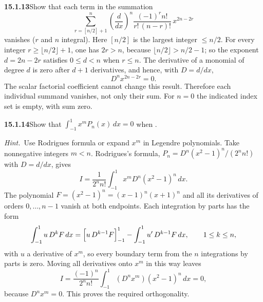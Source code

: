 \par\bigskip
\noindent\textbf{15.1.13}\quad Show that each term in the summation
\[
\sum_{r=[n/2]+1}^{n}\left(\frac{d}{dx}\right)^{n}
\frac{(-1)^{r}n!}{r!\,(n-r)!}\,x^{2n-2r}
\]
vanishes ($r$ and $n$ integral). Here $[n/2]$ is the largest integer
$\le n/2$.
\solution
For every integer $r\ge\lfloor n/2\rfloor+1$, one has $2r>n$,
because $\lfloor n/2\rfloor>n/2-1$; so the exponent $d=2n-2r$
satisfies $0\le d<n$ when $r\le n$.
The derivative of a monomial of degree $d$ is zero after $d+1$
derivatives, and hence, with $D=d/dx$,
\[
D^nx^{2n-2r}=0.
\]
The scalar factorial coefficient cannot change this result. Therefore
each individual summand vanishes, not only their sum.
For $n=0$ the indicated index set is empty, with sum zero.

\par\bigskip
\noindent\textbf{15.1.14}\quad Show that
$\displaystyle\int_{-1}^{1}x^{m}P_{n}(x)\,dx=0$ when .
\par\emph{Hint.}~Use Rodrigues formula or expand $x^{m}$ in Legendre
polynomials.
\solution
Take nonnegative integers $m<n$. Rodrigues's formula,
$P_n=D^n(x^2-1)^n/(2^nn!)$ with $D=d/dx$, gives
\[
I=\frac1{2^nn!}\int_{-1}^1x^mD^n(x^2-1)^n\,dx.
\]
The polynomial $F=(x^2-1)^n=(x-1)^n(x+1)^n$ and all its derivatives
of orders $0,\ldots,n-1$ vanish at both endpoints. Each integration by
parts has the form
\[
\int_{-1}^1u\,D^kF\,dx=\Bigl[u\,D^{k-1}F\Bigr]_{-1}^1
-\int_{-1}^1u'\,D^{k-1}F\,dx,\qquad 1\le k\le n,
\]
with $u$ a derivative of $x^m$, so every boundary term from the $n$
integrations by parts is zero. Moving all derivatives onto $x^m$ in
this way leaves
\[
I=\frac{(-1)^n}{2^nn!}\int_{-1}^1(D^nx^m)(x^2-1)^n\,dx=0,
\]
because $D^nx^m=0$. This proves the required orthogonality.

